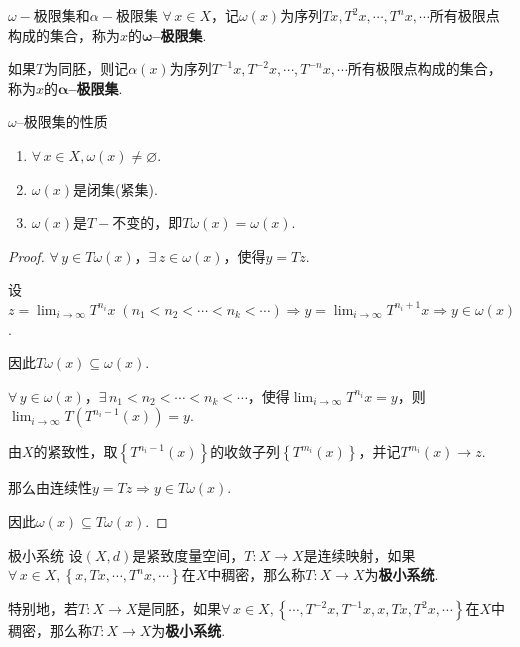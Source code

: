 \begin{definition}{$\omega-$极限集和$\alpha-$极限集}
    $\forall\, x\in X$，记$\omega(x)$为序列$Tx,T^2x,\cdots,T^nx,\cdots$所有极限点构成的集合，称为$x$的\textbf{$\bm{\omega}$--极限集}.\par
    如果$T$为同胚，则记$\alpha(x)$为序列$T^{-1}x,T^{-2}x,\cdots,T^{-n}x,\cdots$所有极限点构成的集合，称为$x$的\textbf{$\bm{\alpha}$--极限集}.
\end{definition}

\begin{proposition}{$\omega$--极限集的性质}
    \begin{enumerate}
        \item $\forall\, x\in X,\omega(x)\neq\varnothing$.
        \item $\omega(x)$是闭集(紧集).
        \item $\omega(x)$是$T-$不变的，即$T\omega(x)=\omega(x)$.
    \end{enumerate}
\end{proposition}
\begin{proof}
    $\forall\, y\in T\omega(x)$，$\exists\, z\in\omega(x)$，使得$y=Tz$.\par
    设$z=\lim_{i\to\infty}T^{n_i}x\;(n_1<n_2<\cdots<n_k<\cdots)\Rightarrow y=\lim_{i\to\infty}T^{n_i+1}x\Rightarrow y\in\omega(x)$.\par
    因此$T\omega(x)\subseteq \omega(x)$.\par
    $\forall\, y\in\omega(x)$，$\exists\, n_1<n_2<\cdots<n_k<\cdots$，使得$\lim_{i\to\infty}{T^{n_i}x}=y$，则$\lim_{i\to\infty}T \left(T^{n_i-1}(x)\right)=y$.\par
    由$X$的紧致性，取$\left\{T^{n_i-1}(x)\right\}$的收敛子列$\left\{T^{m_i}(x)\right\}$，并记$T^{m_i}(x)\to z$.\par
    那么由连续性$y=Tz\Rightarrow y\in T\omega(x)$.\par
    因此$\omega(x)\subseteq T\omega(x)$.
\end{proof}

\begin{definition}{极小系统}
    设$(X,d)$是紧致度量空间，$T:X\to X$是连续映射，如果$\forall\, x\in X,\left\{x,Tx,\cdots,T^nx,\cdots\right\}$在$X$中稠密，那么称$T:X\to X$为\textbf{极小系统}.\par
    特别地，若$T:X\to X$是同胚，如果$\forall\, x\in X, \left\{\cdots,T^{-2}x,T^{-1}x,x,Tx,T^2x,\cdots\right\}$在$X$中稠密，那么称$T:X\to X$为\textbf{极小系统}.
\end{definition}

